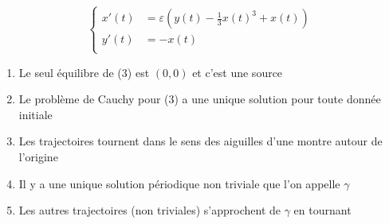 \documentclass{article}
\begin{document}
\begin{equation}
    \left\{
    \begin{aligned}
        x'(t) &= \varepsilon (y(t) - \frac{1}{3} x(t)^3 + x(t)) \\   
        y'(t) &= -x(t)\\
   \end{aligned}
   \right.
\end{equation}

\begin{enumerate}
    \item Le seul équilibre de (3) est $(0, 0)$ et c’est une source
    \item Le problème de Cauchy pour (3) a une unique solution pour toute donnée initiale
    \item Les trajectoires tournent dans le sens des aiguilles d’une montre autour de l’origine
    \item Il y a une unique solution périodique non triviale que l’on appelle $\gamma$ 
    \item Les autres trajectoires (non triviales) s’approchent de $\gamma$ en tournant
\end{enumerate}

\medskip
\end{document}
